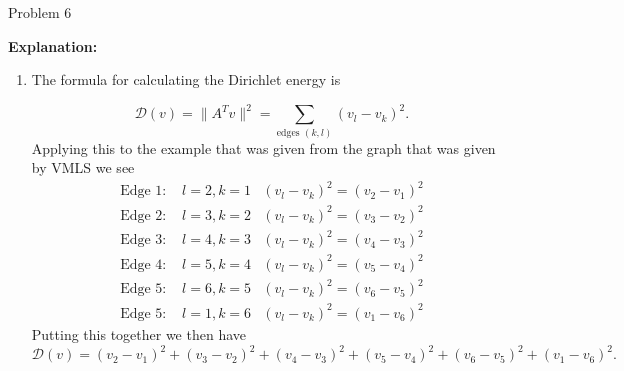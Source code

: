 \begin{problem}{Problem 6}
\begin{highlight}
        \noindent \textbf{Explanation:}

        \begin{enumerate}[label = (\alph*), start = 3]
            \item The formula for calculating the Dirichlet energy is 
            
            \begin{equation*}
                \mathcal{D}(v) = \|A^{T}v\|^{2} = \sum_{\text{edges } (k,l)} (v_{l} - v_{k})^{2}.
            \end{equation*}
            Applying this to the example that was given from the graph that was given by VMLS we see
            \setcounter{equation}{0}
            \begin{align}
                \text{Edge 1: } & l = 2, k = 1 & (v_{l} - v_{k})^{2} = (v_{2} - v_{1})^{2} \\
                \text{Edge 2: } & l = 3, k = 2 & (v_{l} - v_{k})^{2} = (v_{3} - v_{2})^{2} \\
                \text{Edge 3: } & l = 4, k = 3 & (v_{l} - v_{k})^{2} = (v_{4} - v_{3})^{2} \\
                \text{Edge 4: } & l = 5, k = 4 & (v_{l} - v_{k})^{2} = (v_{5} - v_{4})^{2} \\
                \text{Edge 5: } & l = 6, k = 5 & (v_{l} - v_{k})^{2} = (v_{6} - v_{5})^{2} \\
                \text{Edge 5: } & l = 1, k = 6 & (v_{l} - v_{k})^{2} = (v_{1} - v_{6})^{2}
            \end{align}
            Putting this together we then have
            \begin{equation}
                \mathcal{D}(v) = (v_{2} - v_{1})^{2} + (v_{3} - v_{2})^{2} + (v_{4} - v_{3})^{2} + (v_{5} - v_{4})^{2} + (v_{6} - v_{5})^{2} + (v_{1} - v_{6})^{2}.
            \end{equation}
        \end{enumerate}
    \end{highlight}
\end{problem}

